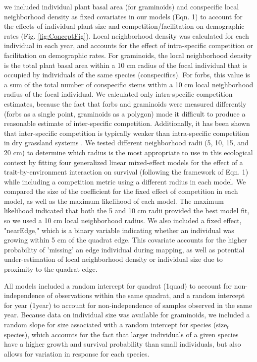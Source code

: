 \documentclass[12pt, letterpaper]{article}
\begin{document}
we included individual plant basal area (for graminoids) and conspecific local neighborhood density as fixed covariates in our models (Eqn. 1) to account for the effects of individual plant size \citep{Tredennick2018} and competition/facilitation on demographic rates (Fig. \ref{fig:ConceptFig}). Local neighborhood density was calculated for each individual in each year, and accounts for the effect of intra-specific competition or facilitation on demographic rates. For graminoids, the local neighborhood density is the total plant basal area within a 10 cm radius of the focal individual that is occupied by individuals of the same species (conspecifics). For forbs, this value is a sum of the total number of conspecific stems within a 10 cm local neighborhood radius of the focal individual. We calculated only intra-specific competition estimates, because the fact that forbs and graminoids were measured differently (forbs as a single point, graminoids as a polygon) made it difficult to produce a reasonable estimate of inter-specific competition. Additionally, it has been shown that inter-specific competition is typically weaker than intra-specific competition in dry grassland systems \citep{Chu2016, Laughlin2018}. We tested different neighborhood radii (5, 10, 15, and 20 cm) to determine which radius is the most appropriate to use in this ecological context by fitting four generalized linear mixed-effect models for the effect of a trait-by-environment interaction on survival (following the framework of Eqn. 1) while including a competition metric using a different radius in each model. We compared the size of the coefficient for the fixed effect of competition in each model, as well as the maximum likelihood of each model. The maximum likelihood indicated that both the 5 and 10 cm radii provided the best model fit, so we used a 10 cm local neighborhood radius. We also included a fixed effect, "nearEdge," which is a binary variable indicating whether an individual was growing within 5 cm of the quadrat edge. This covariate accounts for the higher probability of ’missing’ an edge individual during mapping, as well as potential under-estimation of local neighborhood density or individual size due to proximity to the quadrat edge.

All models included a random intercept for quadrat (1\textbar quad) to account for non-independence of observations within the same quadrat, and a random intercept for year (1\textbar year) to account for non-independence of samples observed in the same year. Because data on individual size was available for graminoids, we included a random slope for size associated with a random intercept for species (size$_\textit{t}$\textbar species), which accounts for the fact that larger individuals of a given species have a higher growth and survival probability than small individuals, but also allows for variation in response for each species. 
\end{document}
